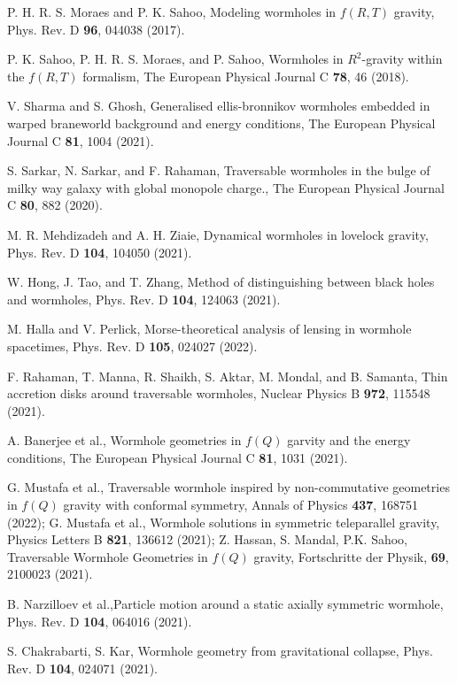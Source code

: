 \begin{thebibliography}{87}
P. H. R. S. Moraes and P. K. Sahoo, Modeling wormholes in $f(R,T)$ gravity, Phys. Rev. D \textbf{96}, 044038 (2017).

 P. K. Sahoo, P. H. R. S. Moraes, and P. Sahoo, Wormholes in $R^2$-gravity within the $f(R,T)$ formalism, The European Physical
Journal C \textbf{78}, 46 (2018).

 V. Sharma and S. Ghosh, Generalised ellis-bronnikov wormholes embedded in warped braneworld background and energy
conditions, The European Physical Journal C \textbf{81}, 1004 (2021).

 S. Sarkar, N. Sarkar, and F. Rahaman, Traversable wormholes in the bulge of milky way galaxy with global monopole charge.,
The European Physical Journal C \textbf{80}, 882 (2020).

 M. R. Mehdizadeh and A. H. Ziaie, Dynamical wormholes in lovelock gravity, Phys. Rev. D \textbf{104}, 104050 (2021).

 W. Hong, J. Tao, and T. Zhang, Method of distinguishing between black holes and wormholes, Phys. Rev. D \textbf{104}, 124063
(2021).

 M. Halla and V. Perlick, Morse-theoretical analysis of lensing in wormhole spacetimes, Phys. Rev. D \textbf{105}, 024027 (2022).

F. Rahaman, T. Manna, R. Shaikh, S. Aktar, M. Mondal, and B. Samanta, Thin accretion disks around traversable wormholes,
Nuclear Physics B \textbf{972}, 115548 (2021).

 A. Banerjee et al., Wormhole geometries in $f(Q)$ garvity and the energy conditions, The European Physical Journal C \textbf{81}, 1031 (2021).

 G. Mustafa et al., Traversable wormhole inspired by non-commutative geometries in $f(Q)$ gravity with conformal symmetry, Annals of Physics \textbf{437}, 168751 (2022); G. Mustafa et al., Wormhole solutions in symmetric teleparallel gravity, Physics Letters B \textbf{821}, 136612 (2021); Z. Hassan, S. Mandal, P.K. Sahoo, Traversable Wormhole Geometries in $f(Q)$ gravity, Fortschritte der Physik, \textbf{69}, 2100023 (2021).

 B. Narzilloev et al.,Particle motion around a static axially symmetric wormhole, Phys. Rev. D \textbf{104}, 064016 (2021).

S. Chakrabarti, S. Kar, Wormhole geometry from gravitational collapse, Phys. Rev. D \textbf{104}, 024071 (2021).


\end{thebibliography}
